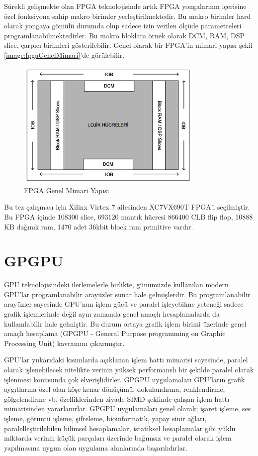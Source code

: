 Sürekli gelişmekte olan FPGA teknolojisinde artık FPGA yongalarının içerisine özel fonksiyona sahip makro birimler yerleştirilmektedir. Bu makro birimler hard olarak yongaya gömülü durumda olup sadece izin verilen ölçüde parametreleri programlanabilmektedirler. Bu makro bloklara örnek olarak DCM, RAM, DSP slice, çarpıcı birimleri gösterilebilir. Genel olarak bir FPGA’in mimari yapısı şekil \ref{image:fpgaGenelMimari}’de görülebilir.
\begin{figure}[h]
\centering
\shorthandoff{=}
\includegraphics[width=0.8\textwidth]{gorsel/fpgaGenelMimari.png}
\shorthandoff{=}
\caption{FPGA Genel Mimari Yapısı}
\label{fpgaGenelMimari}
\end{figure}
Bu tez çalışması için Xilinx Virtex 7 ailesinden XC7VX690T FPGA’i seçilmiştir. Bu FPGA içinde 108300 slice, 693120 mantık hücresi 866400 CLB flip flop, 10888 KB dağınık ram, 1470 adet 36kbit block ram primitive vardır. \par

\section{GPGPU}

GPU teknolojisindeki ilerlemelerle birlikte, günümüzde kullanılan modern GPU’lar programlanabilir arayüzler sunar hale gelmişlerdir. Bu programlanabilir arayüzler sayesinde GPU’nun işlem gücü ve paralel işleyebilme yeteneği sadece grafik işlemlerinde değil aynı zamanda genel amaçlı hesaplamalarda da kullanılabilir hale gelmiştir. Bu durum ortaya grafik işlem birimi üzerinde genel amaçlı hesaplama (GPGPU - General Purpose programming on Graphic Processing Unit) kavramını çıkarmıştır. \par
GPU’lar yukarıdaki kısımlarda açıklanan işlem hattı mimarisi sayesinde, paralel olarak işlenebilecek nitelikte verinin yüksek performanslı bir şekilde paralel olarak işlenmesi konusunda çok elverişlidirler. GPGPU uygulamaları GPU’ların grafik aygıtlarına özel olan köşe kenar dönüşümü, dokulandırma, renklendirme, gölgelendirme vb. özelliklerinden ziyade SIMD şeklinde çalışan işlem hattı mimarisinden yararlanırlar. GPGPU uygulamaları genel olarak; işaret işleme, ses işleme, görüntü işleme, şifreleme, bioinformatik, yapay sinir ağları, paralelleştirilebilen bilimsel hesaplamalar, istatiksel hesaplamalar gibi yüklü miktarda verinin küçük parçaları üzerinde bağımsız ve paralel olarak işlem yapılmasına uygun olan uygulama alanlarında başarılıdırlar. \cite{ertanYildizThesis}\par

